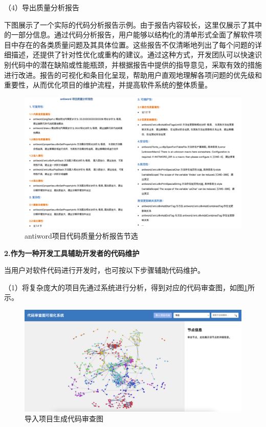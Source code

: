 \noindent（4）导出质量分析报告

下图展示了一个实际的代码分析报告示例。由于报告内容较长，这里仅展示了其中的一部分信息。通过代码分析报告，用户能够以结构化的清单形式全面了解软件项目中存在的各类质量问题及其具体位置。这些报告不仅清晰地列出了每个问题的详细描述，还提供了针对性优化或重构的建议。通过这种方式，开发团队可以快速识别代码中的潜在缺陷或性能瓶颈，并根据报告中提供的指导意见，采取有效的措施进行改进。报告的可视化和条目化呈现，帮助用户直观地理解各项问题的优先级和重要性，从而优化项目的维护流程，并提高软件系统的整体质量。

\clearpage

\begin{figure}[h]
\centering
\includegraphics[width = 1.0\textwidth]{figures/报告.png}
\caption{antiword项目代码质量分析报告节选}
\end{figure}


\noindent \textbf{2.作为一种开发工具辅助开发者的代码维护} 

当用户对软件代码进行开发时，也可按以下步骤辅助代码维护。

\noindent（1）将复杂庞大的项目先通过系统进行分析，得到对应的代码审查图，如图\ref{1_导入项目生成代码审查图}所示。

\begin{figure}[h]
\centering
\includegraphics[width = 1.0\textwidth]{figures/开发1.jpg}
\caption{导入项目生成代码审查图}
\label{1_导入项目生成代码审查图}
\end{figure}

